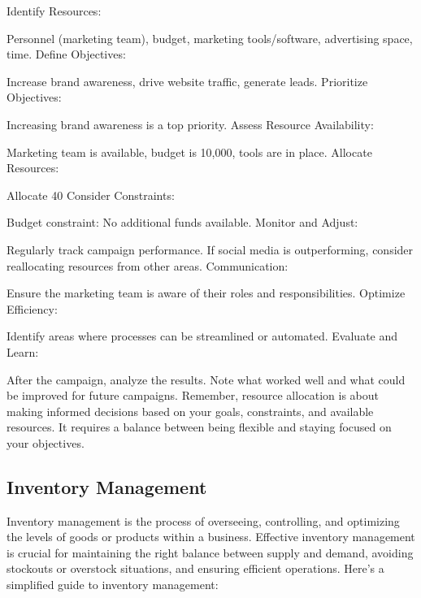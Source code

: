 Identify Resources:

Personnel (marketing team), budget, marketing tools/software, advertising space, time.
Define Objectives:

Increase brand awareness, drive website traffic, generate leads.
Prioritize Objectives:

Increasing brand awareness is a top priority.
Assess Resource Availability:

Marketing team is available, budget is 10,000, tools are in place.
Allocate Resources:

Allocate 40%
Consider Constraints:

Budget constraint: No additional funds available.
Monitor and Adjust:

Regularly track campaign performance. If social media is outperforming, consider reallocating resources from other areas.
Communication:

Ensure the marketing team is aware of their roles and responsibilities.
Optimize Efficiency:

Identify areas where processes can be streamlined or automated.
Evaluate and Learn:

After the campaign, analyze the results. Note what worked well and what could be improved for future campaigns.
Remember, resource allocation is about making informed decisions based on your goals, constraints, and available resources. It requires a balance between being flexible and staying focused on your objectives.

%
\subsection{Inventory Management}
\label{relatedknowledge:Supply Chain Management:Inventory Management}
%
Inventory management is the process of overseeing, controlling, and optimizing the levels of goods or products within a business. Effective inventory management is crucial for maintaining the right balance between supply and demand, avoiding stockouts or overstock situations, and ensuring efficient operations. Here's a simplified guide to inventory management:

